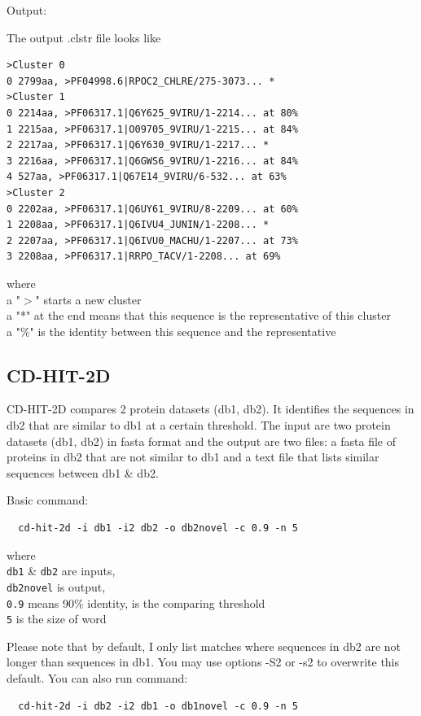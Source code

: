 \documentclass[12pt,a4paper]{article}
\begin{document}
Output:

The output .clstr file looks like
\begin{lstlisting}
>Cluster 0
0 2799aa, >PF04998.6|RPOC2_CHLRE/275-3073... *
>Cluster 1
0 2214aa, >PF06317.1|Q6Y625_9VIRU/1-2214... at 80%
1 2215aa, >PF06317.1|O09705_9VIRU/1-2215... at 84%
2 2217aa, >PF06317.1|Q6Y630_9VIRU/1-2217... *
3 2216aa, >PF06317.1|Q6GWS6_9VIRU/1-2216... at 84%
4 527aa, >PF06317.1|Q67E14_9VIRU/6-532... at 63%
>Cluster 2
0 2202aa, >PF06317.1|Q6UY61_9VIRU/8-2209... at 60%
1 2208aa, >PF06317.1|Q6IVU4_JUNIN/1-2208... *
2 2207aa, >PF06317.1|Q6IVU0_MACHU/1-2207... at 73%
3 2208aa, >PF06317.1|RRPO_TACV/1-2208... at 69%
\end{lstlisting}

where\\
a "$>$" starts a new cluster\\
a "*" at the end means that this sequence is the representative of this cluster\\
a "\%" is the identity between this sequence and the representative

\subsection{CD-HIT-2D }

CD-HIT-2D compares 2 protein datasets (db1, db2). It identifies the sequences in db2 that are similar to db1 at a certain threshold. The input are two protein datasets (db1, db2) in fasta format and the output are two files: a fasta file of proteins in db2 that are not similar to db1 and a text file that lists similar sequences between db1 \& db2.

Basic command:

\begin{lstlisting}
  cd-hit-2d -i db1 -i2 db2 -o db2novel -c 0.9 -n 5
\end{lstlisting}
where\\
\texttt{db1} \& \texttt{db2} are inputs,\\
\texttt{db2novel} is output,\\
\texttt{0.9} means 90\% identity, is the comparing threshold\\
\texttt{5} is the size of word

Please note that by default, I only list matches where sequences in db2 are
not longer than sequences in db1. You may use options -S2 or -s2 to overwrite
this default. You can also run command:

\begin{lstlisting}
  cd-hit-2d -i db2 -i2 db1 -o db1novel -c 0.9 -n 5  
\end{lstlisting}
\end{document}

